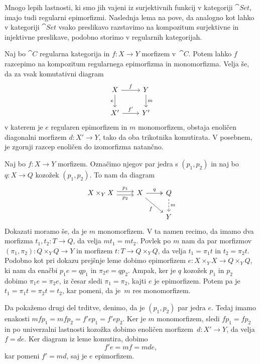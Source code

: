 \documentclass[../kategoricna_logika.tex]{subfiles}
\begin{document}
Mnogo lepih lastnosti, ki smo
jih vajeni iz surjektivnih funkcij v kategoriji $\cat{Set}$, imajo
tudi regularni epimorfizmi.
Naslednja lema na pove, da analogno kot lahko v kategoriji $\cat{Set}$
vsako preslikavo razstavimo na kompozitum surjektivne in
injektivne preslikave, podobno storimo v regularnih kategorijah.
\begin{lema}
  Naj bo $\cat{C}$ regularna kategorija in $f: X \to Y$ morfizem
  v~$\cat{C}$.  Potem lahko $f$ razcepimo na kompozitum regularnega
  epimorfizma in monomorfizma.  Velja še, da za vsak komutativni
  diagram
  \begin{equation*}
    \begin{tikzcd}
      X \ar[d, "e"'] \ar[r, "f"] & Y \ar[d, "m"] \\
      X' \ar[r, "f'"] & Y'
    \end{tikzcd}
  \end{equation*}
  v katerem je $e$ regularen epimorfizem in $m$ monomorfizem, obstaja
  enoličen diagonalni morfizem $d : X' \to Y$, tako da oba trikotnika
  komutirata.  V posebnem, je zgornji razcep enoličen do izomorfizma
  natančno.
\end{lema}
\begin{comment}
  \begin{opomba}
    Pokažimo, da zgornja trditev res pomeni, da so slike morfizmov
    enolične.
  \end{opomba}
\end{comment}
\begin{dokaz}
  Naj bo $f : X \to Y$ morfizem.  Označimo njegov par jedra s
  $(p_1, p_2)$ in naj bo $q : X \to Q$ kozožek $(p_1, p_2)$.  To nam da
  diagram
  \begin{equation*}
    \begin{tikzcd}
      X \times_Y X \ar[r, shift left, "p_1"] \ar[r, shift right,
      "p_2"'] &
      X \ar[dr, "f"'] \ar[r, two heads, "q"] & Q \ar[d, dashed, "m"] \\
      & & Y
    \end{tikzcd}
  \end{equation*}
  Dokazati moramo še, da je $m$ monomorfizem. V ta namen recimo, da
  imamo dva morfizma $t_1, t_2 : T \to Q$, da velja $m t_1 = m
  t_2$. Povlek po $m$ nam da par morfizmov
  $(\pi_1, \pi_2) : Q \times_Y Q \to Y$ in morfizem
  $t : T \to Q \times_Y Q$, da velja $t_1 = \pi_1 t$ in
  $t_2 = \pi_2 t$.  Podobno kot pri dokazu prejšnje leme dobimo
  epimorfizem $e : X \times_Y X \to Q \times_Y Q$, ki nam da enačbi
  $p_1 e = q p_1$ in $\pi_2 e = q p_2$.  Ampak, ker je $q$ kozožek
  $p_1$ in $p_2$ dobimo $\pi_1 e = \pi_2 e$, iz česar sledi
  $\pi_1 = \pi_2$, kajti $e$ je epimorfizem.  Potem pa je
  $t_1 = \pi_1 t = \pi_2 t = t_2$, kar pomeni, da je~$m$ res
  monomorfizem.

  Da pokažemo drugi del trditve, denimo, da je $(p_1, p_2)$ par jedra
  $e$.  Tedaj imamo enakosti
  $m f p_1 = m f p_2 = f' e p_1 = f' e p_2$.  Ker je $m$ monomorfizem,
  sledi $f p_1 = f p_2$ in po univerzalni lastnosti kozožka dobimo
  enoličen morfizem~$d : X' \to Y$, da velja $f = d e$. Ker diagram
  iz leme komutira, dobimo
  \[f' e = m f = m d e, \] kar pomeni $f' = m d$, saj je $e$
  epimorfizem.
\end{dokaz}
\end{document}
